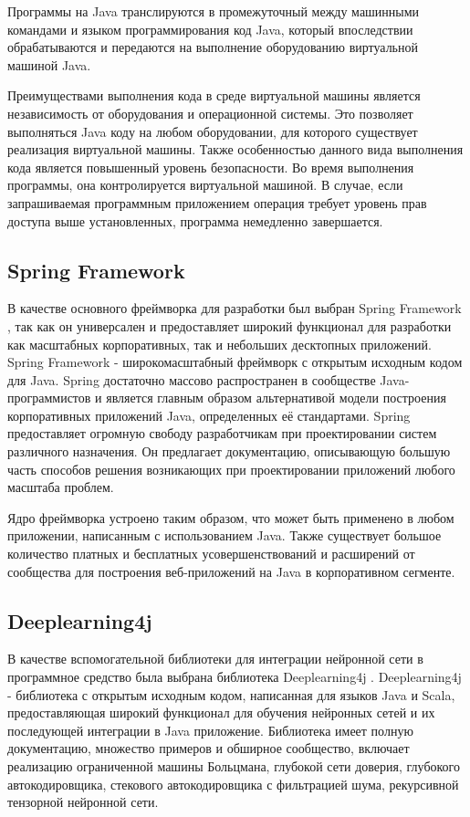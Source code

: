 Программы на Java транслируются в промежуточный между машинными командами и языком программирования код Java, который впоследствии обрабатываются и передаются на выполнение оборудованию виртуальной машиной Java.

Преимуществами выполнения кода в среде виртуальной машины является независимость от оборудования и операционной системы.
Это позволяет выполняться Java коду на любом оборудовании, для которого существует реализация виртуальной машины.
Также особенностью данного вида выполнения кода является повышенный уровень безопасности. Во время выполнения программы, она контролируется виртуальной машиной.
В случае, если запрашиваемая программным приложением операция требует уровень прав доступа выше установленных, программа немедленно завершается.

\subsection{Spring Framework}

В качестве основного фреймворка для разработки был выбран Spring Framework \cite{spring-book}, так как он универсален и предоставляет широкий функционал для разработки как масштабных корпоративных, так и небольших десктопных приложений.
Spring Framework - широкомасштабный фреймворк с открытым исходным кодом для Java.
Spring достаточно массово распространен в сообществе Java-программистов и является главным образом альтернативой модели построения корпоративных приложений Java, определенных её стандартами.
Spring предоставляет огромную свободу разработчикам при проектировании систем различного назначения. Он предлагает документацию, описывающую большую часть способов решения возникающих при проектировании приложений любого масштаба проблем.

Ядро фреймворка устроено таким образом, что может быть применено в любом приложении, написанным с использованием Java. 
Также существует большое количество платных и бесплатных усовершенствований и расширений от сообщества для построения веб-приложений на Java в корпоративном сегменте.

\subsection{Deeplearning4j}

В качестве вспомогательной библиотеки для интеграции нейронной сети в программное средство была выбрана библиотека Deeplearning4j \cite{deeplearning4j-book}.
Deeplearning4j - библиотека с открытым исходным кодом, написанная для языков Java и Scala, предоставляющая широкий функционал для обучения нейронных сетей и их последующей интеграции в Java приложение.
Библиотека имеет полную документацию, множество примеров и обширное сообщество, включает реализацию ограниченной машины Больцмана, глубокой сети доверия, глубокого автокодировщика, стекового автокодировщика с фильтрацией шума, рекурсивной тензорной нейронной сети.

\clearpage